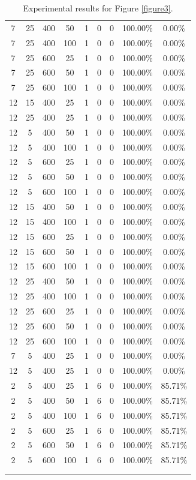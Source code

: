 {\begin{longtable}{| c | c | c | c | c | c | c | c | c |}
7 & 25 & 400 & 50 & 1 & 0 & 0 & 100.00\% & 0.00\% \\
7 & 25 & 400 & 100 & 1 & 0 & 0 & 100.00\% & 0.00\% \\
7 & 25 & 600 & 25 & 1 & 0 & 0 & 100.00\% & 0.00\% \\
7 & 25 & 600 & 50 & 1 & 0 & 0 & 100.00\% & 0.00\% \\
7 & 25 & 600 & 100 & 1 & 0 & 0 & 100.00\% & 0.00\% \\
12 & 15 & 400 & 25 & 1 & 0 & 0 & 100.00\% & 0.00\% \\
12 & 25 & 400 & 25 & 1 & 0 & 0 & 100.00\% & 0.00\% \\
12 & 5 & 400 & 50 & 1 & 0 & 0 & 100.00\% & 0.00\% \\
12 & 5 & 400 & 100 & 1 & 0 & 0 & 100.00\% & 0.00\% \\
12 & 5 & 600 & 25 & 1 & 0 & 0 & 100.00\% & 0.00\% \\
12 & 5 & 600 & 50 & 1 & 0 & 0 & 100.00\% & 0.00\% \\
12 & 5 & 600 & 100 & 1 & 0 & 0 & 100.00\% & 0.00\% \\
12 & 15 & 400 & 50 & 1 & 0 & 0 & 100.00\% & 0.00\% \\
12 & 15 & 400 & 100 & 1 & 0 & 0 & 100.00\% & 0.00\% \\
12 & 15 & 600 & 25 & 1 & 0 & 0 & 100.00\% & 0.00\% \\
12 & 15 & 600 & 50 & 1 & 0 & 0 & 100.00\% & 0.00\% \\
12 & 15 & 600 & 100 & 1 & 0 & 0 & 100.00\% & 0.00\% \\
12 & 25 & 400 & 50 & 1 & 0 & 0 & 100.00\% & 0.00\% \\
12 & 25 & 400 & 100 & 1 & 0 & 0 & 100.00\% & 0.00\% \\
12 & 25 & 600 & 25 & 1 & 0 & 0 & 100.00\% & 0.00\% \\
12 & 25 & 600 & 50 & 1 & 0 & 0 & 100.00\% & 0.00\% \\
12 & 25 & 600 & 100 & 1 & 0 & 0 & 100.00\% & 0.00\% \\
7 & 5 & 400 & 25 & 1 & 0 & 0 & 100.00\% & 0.00\% \\
12 & 5 & 400 & 25 & 1 & 0 & 0 & 100.00\% & 0.00\% \\
2 & 5 & 400 & 25 & 1 & 6 & 0 & 100.00\% & 85.71\% \\
2 & 5 & 400 & 50 & 1 & 6 & 0 & 100.00\% & 85.71\% \\
2 & 5 & 400 & 100 & 1 & 6 & 0 & 100.00\% & 85.71\% \\
2 & 5 & 600 & 25 & 1 & 6 & 0 & 100.00\% & 85.71\% \\
2 & 5 & 600 & 50 & 1 & 6 & 0 & 100.00\% & 85.71\% \\
2 & 5 & 600 & 100 & 1 & 6 & 0 & 100.00\% & 85.71\% \\ \\\hline
\caption{Experimental results for Figure \ref{figure3}.}
\label{table3}
\end{longtable}
}
\endgroup



